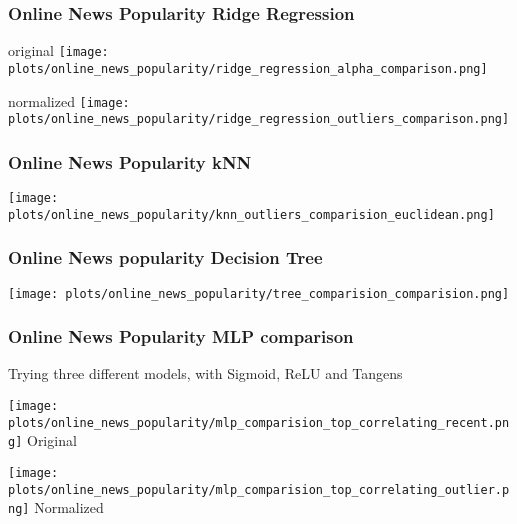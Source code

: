 \documentclass[aspectratio=169]{beamer}
\begin{document}
\begin{frame}{}
\frametitle{Online News Popularity Ridge Regression}
\begin{minipage}{0.49\textwidth}
	\center original
    \texttt{[image: plots/online\_news\_popularity/ridge\_regression\_alpha\_comparison.png]}
\end{minipage}
\begin{minipage}{0.49\textwidth}
	\center normalized
    \texttt{[image: plots/online\_news\_popularity/ridge\_regression\_outliers\_comparison.png]}
\end{minipage}
\end{frame}

\begin{frame}{}
\frametitle{Online News Popularity kNN}
\center
\begin{minipage}{0.69\textwidth}
    \texttt{[image: plots/online\_news\_popularity/knn\_outliers\_comparision\_euclidean.png]}
\end{minipage}
\end{frame}

\begin{frame}{}
\frametitle{Online News popularity Decision Tree}
\center
\begin{minipage}{0.69\textwidth}
    \texttt{[image: plots/online\_news\_popularity/tree\_comparision\_comparision.png]}
\end{minipage}
\end{frame}


\begin{frame}{}
\frametitle{Online News Popularity MLP comparison}
\center Trying three different models, with Sigmoid, ReLU and Tangens
\begin{minipage}{0.49\textwidth}
    \texttt{[image: plots/online\_news\_popularity/mlp\_comparision\_top\_correlating\_recent.png]}
    \center Original
\end{minipage}
\begin{minipage}{0.49\textwidth}
    \texttt{[image: plots/online\_news\_popularity/mlp\_comparision\_top\_correlating\_outlier.png]}
    \center Normalized
\end{minipage}
\end{frame}
\end{document}
